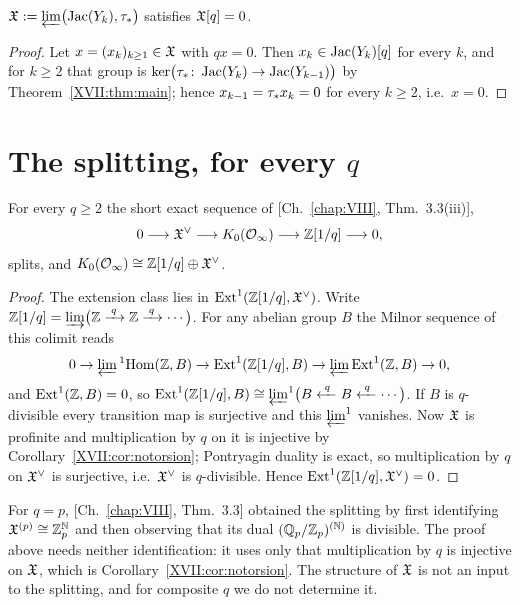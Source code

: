 \begin{corollary}\label{XVII:cor:notorsion}
$\mathfrak{X}:=\varprojlim\bigl(\operatorname{Jac}(Y_k),\tau_*\bigr)$ satisfies $\mathfrak{X}[q]=0$.
\end{corollary}

\begin{proof}
Let $x=(x_k)_{k\ge1}\in\mathfrak{X}$ with $qx=0$. Then $x_k\in\operatorname{Jac}(Y_k)[q]$ for every $k$, and for
$k\ge2$ that group is $\ker\bigl(\tau_*\colon\operatorname{Jac}(Y_k)\to\operatorname{Jac}(Y_{k-1})\bigr)$ by
Theorem~\ref{XVII:thm:main}; hence $x_{k-1}=\tau_* x_k=0$ for every $k\ge2$, i.e.\ $x=0$.
\end{proof}

\section{The splitting, for every \texorpdfstring{$q$}{q}}\label{XVII:sec:split}

\begin{theorem}\label{XVII:thm:split}
For every $q\ge2$ the short exact sequence of [Ch.~\ref{chap:VIII}, Thm.~3.3(iii)],
\[
0\longrightarrow\mathfrak{X}^{\vee}\longrightarrow K_0(\mathcal{O}_\infty)\longrightarrow\mathbb{Z}[1/q]
\longrightarrow0,
\]
splits, and $K_0(\mathcal{O}_\infty)\cong\mathbb{Z}[1/q]\oplus\mathfrak{X}^{\vee}$.
\end{theorem}

\begin{proof}
The extension class lies in $\mathrm{Ext}^1(\mathbb{Z}[1/q],\mathfrak{X}^\vee)$. Write
$\mathbb{Z}[1/q]=\varinjlim\bigl(\mathbb{Z}\xrightarrow{\;q\;}\mathbb{Z}\xrightarrow{\;q\;}\cdots\bigr)$. For any
abelian group $B$ the Milnor sequence of this colimit reads
\[
0\to\varprojlim{}^1\mathrm{Hom}(\mathbb{Z},B)\to\mathrm{Ext}^1(\mathbb{Z}[1/q],B)
\to\varprojlim\mathrm{Ext}^1(\mathbb{Z},B)\to0 ,
\]
and $\mathrm{Ext}^1(\mathbb{Z},B)=0$, so
$\mathrm{Ext}^1(\mathbb{Z}[1/q],B)\cong\varprojlim^1\bigl(B\xleftarrow{\;q\;}B\xleftarrow{\;q\;}\cdots\bigr)$.
If $B$ is $q$-divisible every transition map is surjective and this $\varprojlim^1$
vanishes. Now $\mathfrak{X}$ is profinite and multiplication by $q$ on it is injective by
Corollary~\ref{XVII:cor:notorsion}; Pontryagin duality is exact, so multiplication by $q$ on
$\mathfrak{X}^\vee$ is surjective, i.e.\ $\mathfrak{X}^\vee$ is $q$-divisible. Hence
$\mathrm{Ext}^1(\mathbb{Z}[1/q],\mathfrak{X}^\vee)=0$.
\end{proof}

\begin{remark}\label{XVII:rem:shorter}
For $q=p$, [Ch.~\ref{chap:VIII}, Thm.~3.3] obtained the splitting by first identifying
$\mathfrak{X}^{(p)}\cong\mathbb{Z}_p^{\mathbb N}$ and then observing that its dual
$(\mathbb{Q}_p/\mathbb{Z}_p)^{(\mathbb N)}$ is divisible. The proof above needs neither identification: it
uses only that multiplication by $q$ is injective on $\mathfrak{X}$, which is
Corollary~\ref{XVII:cor:notorsion}. The structure of $\mathfrak{X}$ is not an input to the splitting,
and for composite $q$ we do not determine it.
\end{remark}

